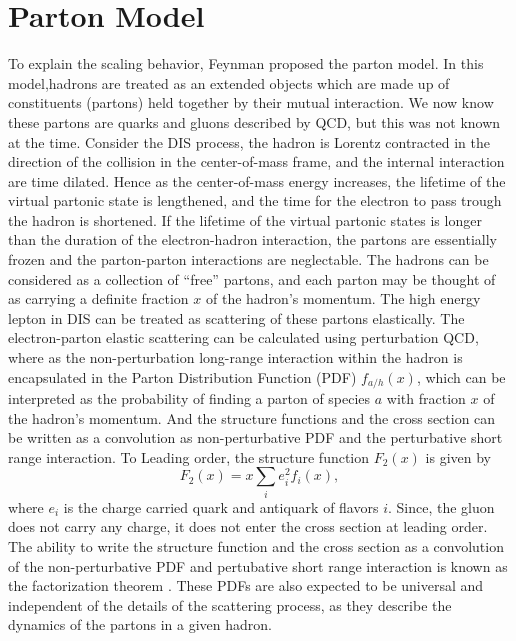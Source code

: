 \section{Parton Model}
\label{sec:parton}
To explain the scaling behavior, Feynman proposed the parton model\cite{feynman1969}.
In this model,hadrons are treated as an extended objects which are made up of 
constituents (partons) held together by their mutual interaction. We now know 
these partons are quarks and gluons described by QCD, but this was not known at 
the time. Consider the DIS process, the hadron is Lorentz contracted in the 
direction of the collision in the center-of-mass frame, and the internal 
interaction are time dilated. Hence as the center-of-mass energy increases, the 
lifetime of the virtual partonic state is lengthened, and the time for the 
electron to pass trough the hadron is shortened. If the lifetime of the virtual
partonic states is longer than the duration of the electron-hadron interaction,
the partons are essentially frozen and the parton-parton interactions are 
neglectable. The hadrons can be considered as a collection of ``free'' partons,
and each parton may be thought of as carrying a definite fraction $x$ of the 
hadron's momentum. The high energy lepton in DIS can be treated as scattering 
of these partons elastically. The electron-parton elastic scattering can be 
calculated using perturbation QCD, where as the non-perturbation long-range 
interaction within the hadron is encapsulated in the Parton Distribution
Function (PDF) $f_{a/h}\left(x\right)$, which can be interpreted as the probability 
of finding a parton of species $a$ with fraction $x$ of the hadron's momentum. 
And the structure functions and the cross section can be written as a convolution
as non-perturbative PDF and the perturbative short range interaction. To Leading
order, the structure function $F_2\left(x\right)$ is given by
\begin{equation}
F_2\left(x\right)=x\sum_i e^2_i f_i\left(x\right),
\end{equation}
where $e_i$ is the charge carried quark and antiquark of flavors $i$. Since, the 
gluon does not carry any charge, it does not enter the cross section at leading 
order. The ability to write the structure function and the cross section as a 
convolution of the non-perturbative PDF and pertubative short range interaction
is known as the factorization theorem \cite{collins1989}. These PDFs are also 
expected to be universal and independent of the details of the scattering 
process, as they describe the dynamics of the partons in a given hadron.

